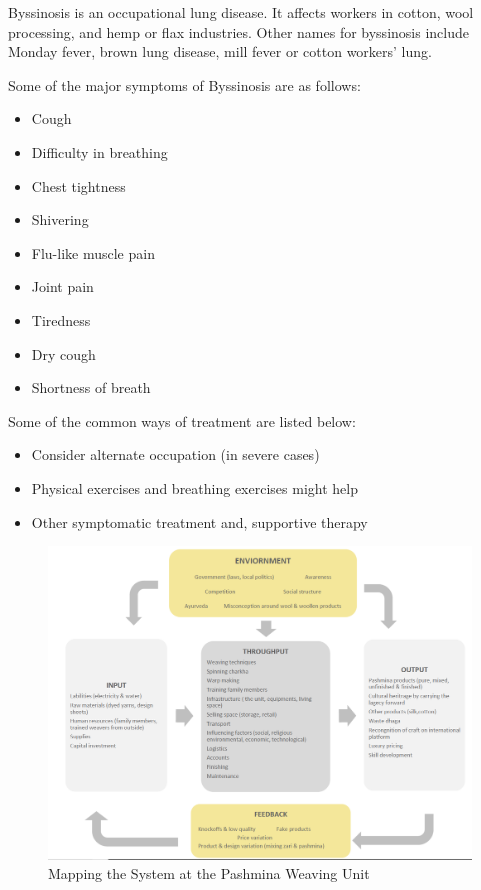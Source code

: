 \documentclass[journal]{IEEEtran}
\begin{document}
\par
Byssinosis is an occupational lung disease. It affects workers in cotton, wool processing, and hemp or flax industries. Other names for byssinosis include Monday fever, brown lung disease, mill fever or cotton workers' lung.

Some of the major symptoms of Byssinosis are as follows:
\begin{itemize}
    \item Cough
    \item Difficulty in breathing
    \item Chest tightness
    \item Shivering
    \item Flu-like muscle pain
    \item Joint pain
    \item Tiredness
    \item Dry cough
    \item Shortness of breath
\end{itemize}

\par
Some of the common ways of treatment are listed below:
\begin{itemize}
    \item Consider alternate occupation (in severe cases)
    \item Physical exercises and breathing exercises might help
    \item Other symptomatic treatment and, supportive therapy
\end{itemize}

\begin{figure}
  \includegraphics[width=\linewidth]{1.PNG}
  \caption{Mapping the System at the Pashmina Weaving Unit }
  \label{Existing System Map at the Pashmina Weaving Unit}
\end{figure}
\end{document}
